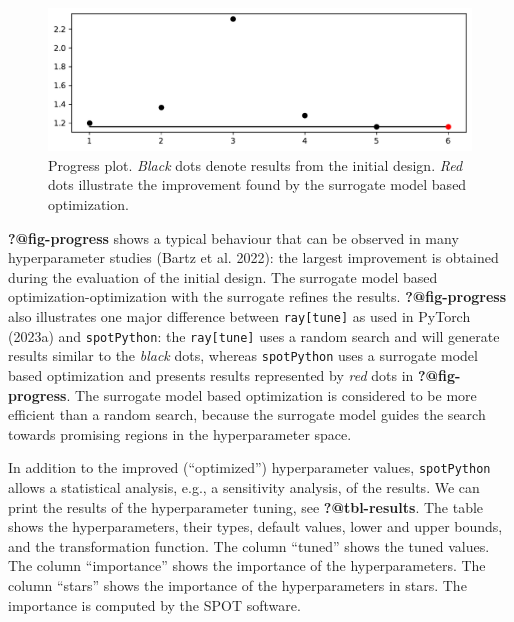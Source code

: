 \documentclass[
  letterpaper,
  DIV=11,
  numbers=noendperiod]{scrreprt}
\begin{document}
\begin{figure}[H]

{\centering \includegraphics{14_spot_ray_hpt_torch_cifar10_files/figure-pdf/cell-25-output-1.pdf}

}

\caption{Progress plot. \emph{Black} dots denote results from the
initial design. \emph{Red} dots illustrate the improvement found by the
surrogate model based optimization.}

\end{figure}

\textbf{?@fig-progress} shows a typical behaviour that can be observed
in many hyperparameter studies (Bartz et al. 2022): the largest
improvement is obtained during the evaluation of the initial design. The
surrogate model based optimization-optimization with the surrogate
refines the results. \textbf{?@fig-progress} also illustrates one major
difference between \texttt{ray{[}tune{]}} as used in PyTorch (2023a) and
\texttt{spotPython}: the \texttt{ray{[}tune{]}} uses a random search and
will generate results similar to the \emph{black} dots, whereas
\texttt{spotPython} uses a surrogate model based optimization and
presents results represented by \emph{red} dots in
\textbf{?@fig-progress}. The surrogate model based optimization is
considered to be more efficient than a random search, because the
surrogate model guides the search towards promising regions in the
hyperparameter space.

In addition to the improved (``optimized'') hyperparameter values,
\texttt{spotPython} allows a statistical analysis, e.g., a sensitivity
analysis, of the results. We can print the results of the hyperparameter
tuning, see \textbf{?@tbl-results}. The table shows the hyperparameters,
their types, default values, lower and upper bounds, and the
transformation function. The column ``tuned'' shows the tuned values.
The column ``importance'' shows the importance of the hyperparameters.
The column ``stars'' shows the importance of the hyperparameters in
stars. The importance is computed by the SPOT software.
\end{document}
